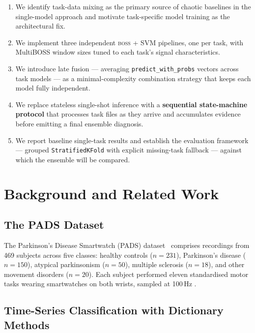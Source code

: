 \documentclass[12pt, a4paper]{article}
\newcommand{\boss}{\textsc{boss}}
\begin{document}
\begin{enumerate}
  \item We identify task-data mixing as the primary source of chaotic
        baselines in the single-model approach and motivate task-specific
        model training as the architectural fix.
  \item We implement three independent \boss{} + SVM pipelines, one
        per task, with MultiBOSS window sizes tuned to each task's
        signal characteristics.
  \item We introduce late fusion — averaging \texttt{predict\_with\_probs}
        vectors across task models — as a minimal-complexity combination
        strategy that keeps each model fully independent.
  \item We replace stateless single-shot inference with a
        \textbf{sequential state-machine protocol} that processes task
        files as they arrive and accumulates evidence before emitting a
        final ensemble diagnosis.
  \item We report baseline single-task results and establish the
        evaluation framework — grouped \texttt{StratifiedKFold} with
        explicit missing-task fallback — against which the ensemble
        will be compared.
\end{enumerate}

\section{Background and Related Work}
\label{sec:background}

\subsection{The PADS Dataset}

The Parkinson's Disease Smartwatch (PADS) dataset~\cite{pads} comprises
recordings from 469 subjects across five classes:
healthy controls ($n=231$), Parkinson's disease ($n=150$),
atypical parkinsonism ($n=50$), multiple sclerosis ($n=18$), and
other movement disorders ($n=20$). Each subject performed eleven
standardised motor tasks wearing smartwatches on both wrists,
sampled at 100\,Hz  .

\subsection{Time-Series Classification with Dictionary Methods}
\end{document}
